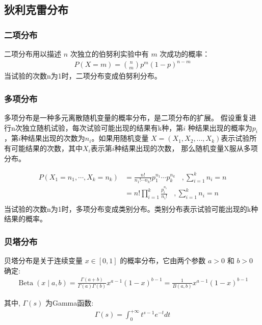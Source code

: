 \documentclass[UTF8]{ctexart}
\begin{document}
\subsection{狄利克雷分布}

\subsubsection{二项分布}
二项分布用以描述 $n$ 次独立的伯努利实验中有 $m$ 次成功的概率：
$$
\begin{aligned}
P(X=m)=\binom{n}{m} p^{m}(1-p)^{n-m}
\end{aligned}
$$
当试验的次数n为1时，二项分布变成伯努利分布。

\subsubsection{多项分布}
多项分布是一种多元离散随机变量的概率分布，是二项分布的扩展。
假设重复进行n次独立随机试验，每次试验可能出现的结果有k种，第$i$
种结果出现的概率为$p_i$，第$i$种结果出现的次数为$n_i$。如果用随机变量
$X=(X_1,X_2,...,X_k)$表示试验所有可能结果的次数，其中$X_i$表示第$i$种结果出现的次数，
那么随机变量X服从多项分布。

$$
\begin{aligned}
    P\left(X_{1}=n_{1}, \cdots, X_{k}=n_{k}\right)&= \frac{n !}{n_{1} ! \cdots n_{k} !} p_{1}^{n_{1}} \cdots p_{k}^{n_{k}} ~~~~ , \sum_{i=1}^{k} n_{i}=n \\ 
&=n ! \prod_{i=1}^{k} \frac{p_{i}^{n_{i}}}{n_{i} !} ~~~~ , \sum_{i=1}^{k} n_{i}=n \\ 
\end{aligned}
$$
当试验的次数n为1时，多项分布变成类别分布。类别分布表示试验可能出现的k种结果的概率。

\subsubsection{贝塔分布}
贝塔分布是关于连续变量 $x \in[0,1]$ 的概率分布，它由两个参数 $a>0$ 和 $b>0$ 确定:
$$
\begin{aligned}
\operatorname{Beta}(x \mid a, b)=\frac{\Gamma(a+b)}{\Gamma(a) \Gamma(b)} x^{a-1}(1-x)^{b-1}=\frac{1}{B(a, b)} x^{a-1}(1-x)^{b-1}
\end{aligned}
$$

其中, $\Gamma(s)$ 为Gamma函数:
$$
\begin{aligned}
\Gamma(s)=\int_{0}^{+\infty} t^{s-1} e^{-t} d t
\end{aligned}
$$
\end{document}
